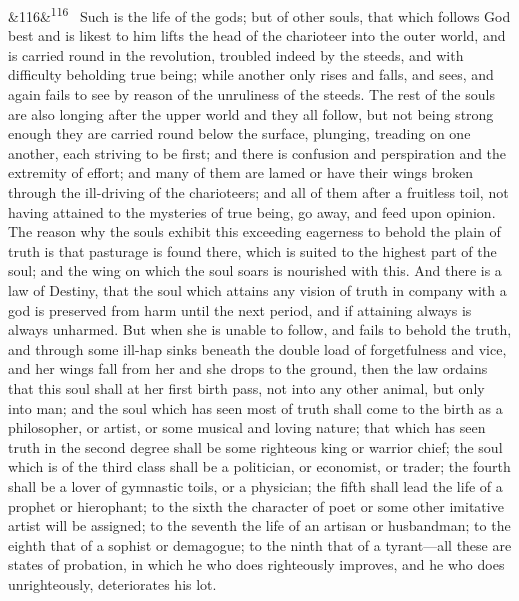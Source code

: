 \documentclass[12pt]{article}
\newcommand{\para}[1][]{\par\noindent\ifx&#1&\else\textsuperscript{\footnotesize #1}~\fi}
\begin{document}
\para[116] Such is the life of the gods; but of other souls, that which follows God best and is likest to him lifts the head of the charioteer into the outer world, and is carried round in the revolution, troubled indeed by the steeds, and with difficulty beholding true being; while another only rises and falls, and sees, and again fails to see by reason of the unruliness of the steeds. The rest of the souls are also longing after the upper world and they all follow, but not being strong enough they are carried round below the surface, plunging, treading on one another, each striving to be first; and there is confusion and perspiration and the extremity of effort; and many of them are lamed or have their wings broken through the ill-driving of the charioteers; and all of them after a fruitless toil, not having attained to the mysteries of true being, go away, and feed upon opinion. The reason why the souls exhibit this exceeding eagerness to behold the plain of truth is that pasturage is found there, which is suited to the highest part of the soul; and the wing on which the soul soars is nourished with this. And there is a law of Destiny, that the soul which attains any vision of truth in company with a god is preserved from harm until the next period, and if attaining always is always unharmed. But when she is unable to follow, and fails to behold the truth, and through some ill-hap sinks beneath the double load of forgetfulness and vice, and her wings fall from her and she drops to the ground, then the law ordains that this soul shall at her first birth pass, not into any other animal, but only into man; and the soul which has seen most of truth shall come to the birth as a philosopher, or artist, or some musical and loving nature; that which has seen truth in the second degree shall be some righteous king or warrior chief; the soul which is of the third class shall be a politician, or economist, or trader; the fourth shall be a lover of gymnastic toils, or a physician; the fifth shall lead the life of a prophet or hierophant; to the sixth the character of poet or some other imitative artist will be assigned; to the seventh the life of an artisan or husbandman; to the eighth that of a sophist or demagogue; to the ninth that of a tyrant---all these are states of probation, in which he who does righteously improves, and he who does unrighteously, deteriorates his lot.
\end{document}
